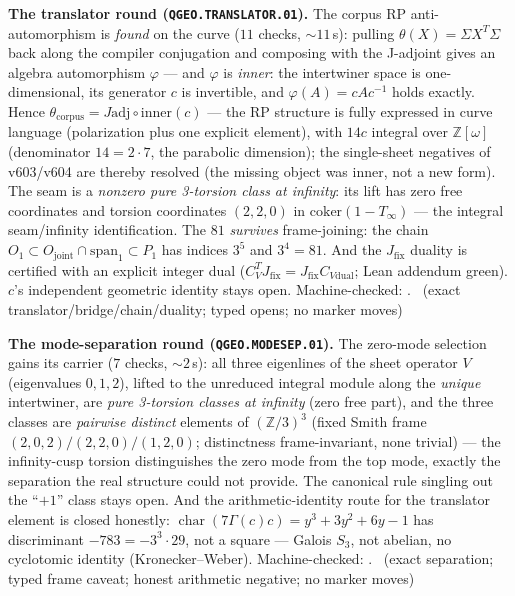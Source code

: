 \documentclass[11pt,a4paper]{article}
\theoremstyle{definition}
\begin{document}
\par\smallskip\noindent\textbf{The translator round
(\texttt{QGEO.TRANSLATOR.01}).}
The corpus RP anti-automorphism is \emph{found} on the curve ($11$
checks, ${\sim}11$\,s): pulling $\theta(X)=\Sigma X^T\Sigma$ back
along the compiler conjugation and composing with the J-adjoint gives
an algebra automorphism $\varphi$ --- and $\varphi$ is \emph{inner}:
the intertwiner space is one-dimensional, its generator $c$ is
invertible, and $\varphi(A)=cAc^{-1}$ holds exactly.  Hence
$\theta_{\mathrm{corpus}}=J\mathrm{adj}\circ\mathrm{inner}(c)$ --- the
RP structure is fully expressed in curve language (polarization plus
one explicit element), with $14c$ integral over
$\mathbb{Z}[\omega]$ (denominator $14=2\cdot7$, the parabolic
dimension); the single-sheet negatives of v603/v604 are thereby
resolved (the missing object was inner, not a new form).  The seam is
a \emph{nonzero pure 3-torsion class at infinity}: its lift has zero
free coordinates and torsion coordinates $(2,2,0)$ in
$\mathrm{coker}(1-T_\infty)$ --- the integral seam/infinity
identification.  The $81$ \emph{survives} frame-joining: the chain
$O_1\subset O_{\mathrm{joint}}\cap\mathrm{span}_1\subset P_1$ has
indices $3^5$ and $3^4=81$.  And the $J_{\mathrm{fix}}$ duality is
certified with an explicit integer dual
($C_V^TJ_{\mathrm{fix}}=J_{\mathrm{fix}}C_{V\mathrm{dual}}$; Lean
addendum green).  $c$'s independent geometric identity stays open.
Machine-checked: .
\mE\ (exact translator/bridge/chain/duality; typed opens; no marker
moves)
\par\smallskip

\par\smallskip\noindent\textbf{The mode-separation round
(\texttt{QGEO.MODESEP.01}).}
The zero-mode selection gains its carrier ($7$ checks, ${\sim}2$\,s):
all three eigenlines of the sheet operator $V$ (eigenvalues $0,1,2$),
lifted to the unreduced integral module along the \emph{unique}
intertwiner, are \emph{pure 3-torsion classes at infinity} (zero free
part), and the three classes are \emph{pairwise distinct} elements of
$(\mathbb{Z}/3)^3$ (fixed Smith frame $(2,0,2)/(2,2,0)/(1,2,0)$;
distinctness frame-invariant, none trivial) --- the infinity-cusp
torsion distinguishes the zero mode from the top mode, exactly the
separation the real structure could not provide.  The canonical rule
singling out the ``$+1$'' class stays open.  And the
arithmetic-identity route for the translator element is closed
honestly: $\operatorname{char}(7\Gamma(c)c)=y^3+3y^2+6y-1$ has
discriminant $-783=-3^3\cdot29$, not a square --- Galois $S_3$, not
abelian, no cyclotomic identity (Kronecker--Weber).
Machine-checked: .
\mE\ (exact separation; typed frame caveat; honest arithmetic
negative; no marker moves)
\par\smallskip
\end{document}
